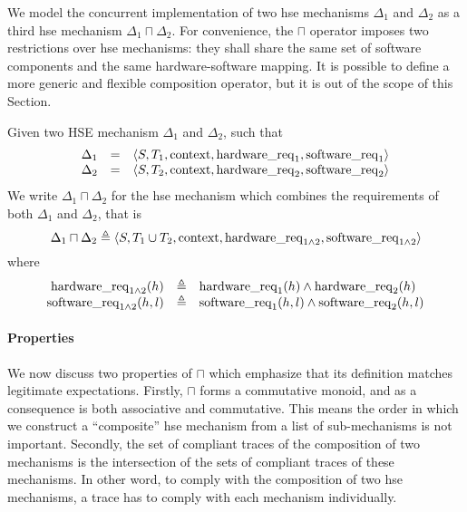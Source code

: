 We model the concurrent implementation of two \ac{hse} mechanisms \( \Delta_1 \)
and \( \Delta_2 \) as a third \ac{hse} mechanism \( \Delta_1 \sqcap \Delta_2 \).
%
For convenience, the \( \sqcap \) operator imposes two restrictions over
\ac{hse} mechanisms: they shall share the same set of software components and
the same hardware-software mapping.
%
It is possible to define a more generic and flexible composition operator, but
it is out of the scope of this Section.

\begin{definition}
  Given two HSE mechanism \( \Delta_1 \) and \( \Delta_2 \), such that
%
  \[
    \begin{array}{rcl}
      \Delta_1
      & =
      & \langle S, T_1, \mathrm{context}, \mathrm{hardware\_req}_1, \mathrm{software\_req}_1
        \rangle \\
      \Delta_2
      & =
      & \langle S, T_2, \mathrm{context}, \mathrm{hardware\_req}_2, \mathrm{software\_req}_2
        \rangle
    \end{array}
  \]
%
  We write $\Delta_1 \sqcap \Delta_2$ for the \ac{hse} mechanism which combines
  the requirements of both $\Delta_1$ and $\Delta_2$, that is
%
  \[
    \Delta_1 \sqcap \Delta_2 \triangleq \langle S, T_1 \cup T_2, \mathrm{context},
    \mathrm{hardware\_req}_{1\wedge2}, \mathrm{software\_req}_{1\wedge2} \rangle
  \]
%
  where
  \[
    \begin{array}{rcl}
      \mathrm{hardware\_req}_{1\wedge2}(h)
      & \triangleq
      & \mathrm{hardware\_req}_1(h) \wedge \mathrm{hardware\_req}_2(h) \\
      \mathrm{software\_req}_{1\wedge2}(h,l)
      & \triangleq
      & \mathrm{software\_req}_1(h,l) \wedge \mathrm{software\_req}_2(h,l)
    \end{array}
  \]
\end{definition}

\paragraph{Properties}
%
We now discuss two properties of \( \sqcap \) which emphasize that its
definition matches legitimate expectations.
%
Firstly, \( \sqcap \) forms a commutative monoid, and as a consequence is both
associative and commutative.
%
This means the order in which we construct a ``composite'' \ac{hse} mechanism
from a list of sub-mechanisms is not important.
%
Secondly, the set of compliant traces of the composition of two mechanisms is
the intersection of the sets of compliant traces of these mechanisms.
%
In other word, to comply with the composition of two \ac{hse} mechanisms, a
trace has to comply with each mechanism individually.


